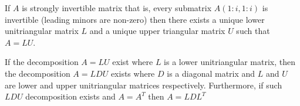 \begin{theorem}
    If \(A\) is strongly invertible matrix that is, every submatrix \(A(1:i,1:i)\)
    is invertible (leading minors are non-zero) then there exists a unique lower unitriangular matrix \(L\) and a unique upper triangular matrix \(U\) such that \(A = LU\).
\end{theorem}

\begin{theorem}
    If the decomposition \(A = LU\) exist where \(L\) is a lower unitriangular matrix, then the decomposition \(A = LDU\) exists where \(D\) is a diagonal matrix and \(L\) and \( U\) are lower and upper unitriangular matrices respectively. Furthermore, if such \(LDU\) decomposition exists and \(A = A^T\) then \(A = LDL^T\)
\end{theorem}
